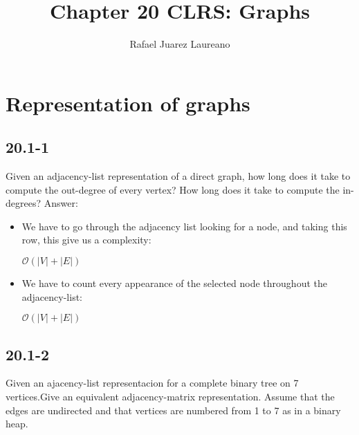 \documentclass{article}
\title{Chapter 20 CLRS: Graphs}
\author{Rafael Juarez Laureano}
\begin{document}
\maketitle

\section{Representation of graphs}

\subsection{20.1-1}
Given an adjacency-list representation of a direct graph, how long does it take to compute the out-degree of every vertex?
How long does it take to compute the in-degrees?
Answer:
\begin{itemize}
    \item 
        We have to go through the adjacency list looking for a node, and taking this row, this give us a complexity:
        
        $\mathcal{O}(|V| + |E|)$
    
    \item 
        We have to count every appearance of the selected node throughout the adjacency-list:
        
        $\mathcal{O}(|V| + |E|)$
\end{itemize}
 
\subsection{20.1-2}
Given an ajacency-list representacion for a complete binary tree on 7 vertices.Give an equivalent adjacency-matrix representation. Assume that the edges are undirected and that vertices are numbered from 1 to 7 as in a binary heap.
\end{document}

